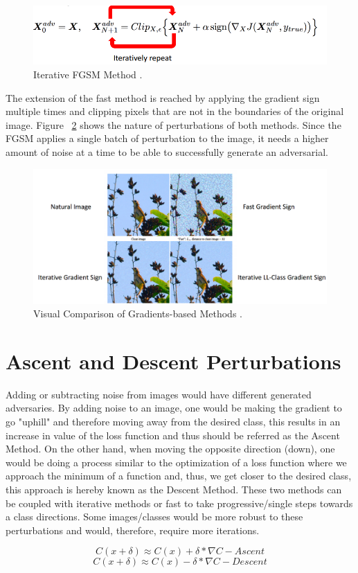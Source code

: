 \begin{figure}[!h]
	\centering
	\includegraphics[scale=0.6]{iter_fgsm.png}
	\caption{Iterative FGSM Method \cite{goodfellow2016}.}
	\label{fig:iter_fgsm_craft}
\end{figure}
The extension of the fast method is reached by applying the gradient sign multiple times and clipping pixels that are not in the boundaries of the original image. Figure ~\ref{fig:iter_single_comp} shows the nature of perturbations of both methods. Since the FGSM applies a single batch of perturbation to the image, it needs a higher amount of noise at a time to be able to successfully generate an adversarial.
\begin{figure}[!h]
	\centering
	\includegraphics[scale=0.4]{iter_single.png}
	\caption{Visual Comparison of Gradients-based Methods \cite{goodfellow2016}.}
	\label{fig:iter_single_comp}
\end{figure}


\section{Ascent and Descent Perturbations}\label{sec:gsm}

Adding or subtracting noise from images would have different generated adversaries. By adding noise to an image, one would be making the gradient to go "uphill" and therefore moving away from the desired class, this results in an increase in value of the loss function and thus should be referred as the Ascent Method. On the other hand, when moving the opposite direction (down), one would be doing a process similar to the optimization of a loss function where we approach the minimum of a function and, thus, we get closer to the desired class, this approach is hereby known as the Descent Method. These two methods can be coupled with iterative methods or fast to take progressive/single steps towards a class directions. Some images/classes would be more robust to these perturbations and would, therefore, require more iterations.

$$ C(x + \delta)\approx C(x) + \delta * \nabla C - Ascent$$
$$ C(x + \delta)\approx C(x) - \delta * \nabla C - Descent$$